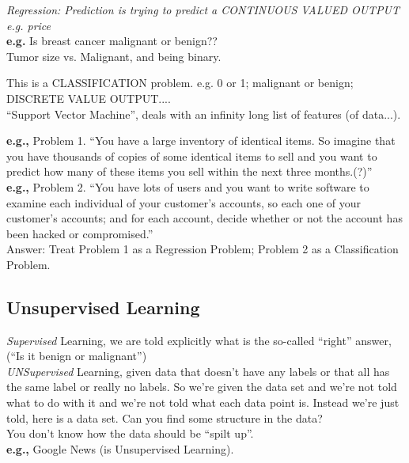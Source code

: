 \documentclass[11pt,a4paper]{article}
\begin{document}
{\it Regression: Prediction is trying to predict a CONTINUOUS VALUED OUTPUT e.g. price}\\

{\bf e.g.} Is breast cancer malignant or benign??\\
Tumor size vs. Malignant, and being binary. 

This is a CLASSIFICATION problem. e.g. 0 or 1; malignant or benign;\\
DISCRETE VALUE OUTPUT....\\

``Support Vector Machine'', deals with an infinity long list of features (of data...). 

{\bf e.g.,} Problem 1.
``You have a large inventory of identical items. So imagine that you have thousands of copies of some identical items to sell and you want to predict how many of these items you sell within the next three months.(?)''\\

{\bf e.g.,} Problem 2.
``You have lots of users and you want to write software to examine each individual of your customer's accounts, so each one of your customer's accounts; and for each account, decide whether or not the account has been hacked or compromised.'' \\

Answer: Treat Problem 1 as a Regression Problem; Problem 2 as a Classification Problem. \\




\subsection{Unsupervised Learning}
{\it Supervised} Learning, we are told explicitly what is the so-called ``right'' answer, (``Is it benign or malignant'')\\

{\it UNSupervised} Learning, given data that doesn't have any labels or that all has the same label or really no labels. 
So we're given the data set and we're not told what to do with it and we're not told what each data point is. Instead we're just told, here is a data set. Can you find some structure in the data?\\

You don't know how the data should be ``spilt up''. \\

{\bf e.g.,} Google News (is Unsupervised Learning). \\
\end{document}
